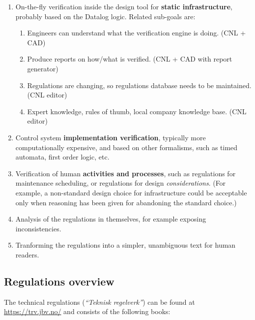 \documentclass[]{article}
\providecommand{\tightlist}{%
  \setlength{\itemsep}{0pt}\setlength{\parskip}{0pt}}
\begin{document}
\begin{enumerate}
\def\labelenumi{\arabic{enumi}.}
\tightlist
\item
  On-the-fly verification inside the design tool for \textbf{static
  infrastructure}, probably based on the Datalog logic. Related
  sub-goals are:

  \begin{enumerate}
  \def\labelenumii{\arabic{enumii}.}
  \tightlist
  \item
    Engineers can understand what the verification engine is doing. (CNL
    + CAD)
  \item
    Produce reports on how/what is verified. (CNL + CAD with report
    generator)
  \item
    Regulations are changing, so regulations database needs to be
    maintained. (CNL editor)
  \item
    Expert knowledge, rules of thumb, local company knowledge base. (CNL
    editor)
  \end{enumerate}
\item
  Control system \textbf{implementation verification}, typically more
  computationally expensive, and based on other formalisms, such as
  timed automata, first order logic, etc.
\item
  Verification of human \textbf{activities and processes}, such as
  regulations for maintenance scheduling, or regulations for design
  \emph{considerations}. (For example, a non-standard design choice for
  infrastructure could be acceptable only when reasoning has been given
  for abandoning the standard choice.)
\item
  Analysis of the regulations in themselves, for example exposing
  inconsistencies.
\item
  Tranforming the regulations into a simpler, unambiguous text for human
  readers.
\end{enumerate}

\subsection{Regulations overview}\label{regulations-overview}

The technical regulations (\emph{``Teknisk regelverk''}) can be found at
\url{https://trv.jbv.no/} and consists of the following books:
\end{document}
